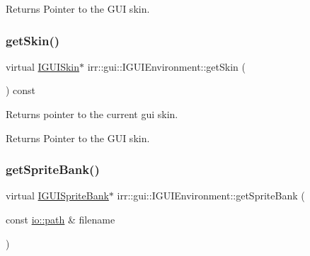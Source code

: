 \begin{DoxyReturn}{Returns}
Pointer to the G\+UI skin. 
\end{DoxyReturn}
\mbox{\label{classirr_1_1gui_1_1IGUIEnvironment_a54ce9072ea7b89cdaea65306e93ba90c}} 
\subsubsection{\texorpdfstring{get\+Skin()}{getSkin()}\hspace{0.1cm}{\footnotesize\ttfamily [2/2]}}
{\footnotesize\ttfamily virtual \hyperlink{classirr_1_1gui_1_1IGUISkin}{I\+G\+U\+I\+Skin}$\ast$ irr\+::gui\+::\+I\+G\+U\+I\+Environment\+::get\+Skin (\begin{DoxyParamCaption}{ }\end{DoxyParamCaption}) const\hspace{0.3cm}{\ttfamily [pure virtual]}}



Returns pointer to the current gui skin. 

\begin{DoxyReturn}{Returns}
Pointer to the G\+UI skin. 
\end{DoxyReturn}
\mbox{\label{classirr_1_1gui_1_1IGUIEnvironment_a187ebb28837dbdb88810f7e493096c3f}} 
\subsubsection{\texorpdfstring{get\+Sprite\+Bank()}{getSpriteBank()}\hspace{0.1cm}{\footnotesize\ttfamily [1/2]}}
{\footnotesize\ttfamily virtual \hyperlink{classirr_1_1gui_1_1IGUISpriteBank}{I\+G\+U\+I\+Sprite\+Bank}$\ast$ irr\+::gui\+::\+I\+G\+U\+I\+Environment\+::get\+Sprite\+Bank (\begin{DoxyParamCaption}\item[{const \hyperlink{namespaceirr_1_1io_a6468281622ce3a1c46b72e19f32dded5}{io\+::path} \&}]{filename }\end{DoxyParamCaption})\hspace{0.3cm}{\ttfamily [pure virtual]}}



